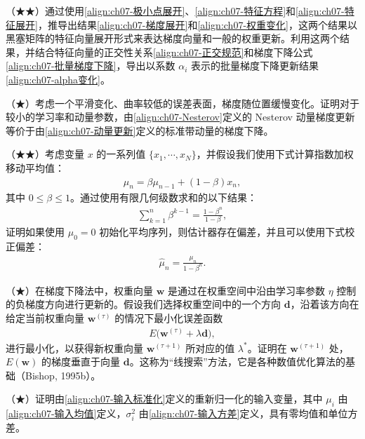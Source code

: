 \documentclass[../../main.tex]{subfiles}
\begin{document}
\begin{exercise}\label{exercise:ch07-10}
（★★）通过使用\eqref{align:ch07-极小点展开}、\eqref{align:ch07-特征方程}和\eqref{align:ch07-特征展开}，推导出结果\eqref{align:ch07-梯度展开}和\eqref{align:ch07-权重变化}，这两个结果以黑塞矩阵的特征向量展开形式来表达梯度向量和一般的权重更新。利用这两个结果，并结合特征向量的正交性关系\eqref{align:ch07-正交规范}和梯度下降公式\eqref{align:ch07-批量梯度下降}，导出以系数 $\alpha_i$ 表示的批量梯度下降更新结果\eqref{align:ch07-alpha变化}。
\end{exercise}

\begin{exercise}\label{exercise:ch07-11}
（★）考虑一个平滑变化、曲率较低的误差表面，梯度随位置缓慢变化。证明对于较小的学习率和动量参数，由\eqref{align:ch07-Nesterov}定义的 Nesterov 动量梯度更新等价于由\eqref{align:ch07-动量更新}定义的标准带动量的梯度下降。
\end{exercise}

\begin{exercise}\label{exercise:ch07-12}
（★★）考虑变量 $x$ 的一系列值 $\{x_1,\cdots,x_N\}$，并假设我们使用下式计算指数加权移动平均值：
\begin{align}
\mu_n = \beta\mu_{n-1}+(1-\beta)x_n,
\label{align:ch07-习题ewma}
\end{align}
其中 $0\leqslant\beta\leqslant1$。通过使用有限几何级数求和的以下结果：
\begin{align}
\sum_{k=1}^{n}\beta^{k-1} = \frac{1-\beta^{n}}{1-\beta},
\label{align:ch07-习题几何级数}
\end{align}
证明如果使用 $\mu_0=0$ 初始化平均序列，则估计器存在偏差，并且可以使用下式校正偏差：
\begin{align}
\hat{\mu}_n = \frac{\mu_n}{1-\beta^{n}}.
\label{align:ch07-习题偏差校正}
\end{align}
\end{exercise}

\begin{exercise}\label{exercise:ch07-13}
（★）在梯度下降法中，权重向量 $\mathbf{w}$ 是通过在权重空间中沿由学习率参数 $\eta$ 控制的负梯度方向进行更新的。假设我们选择权重空间中的一个方向 $\mathbf{d}$，沿着该方向在给定当前权重向量 $\mathbf{w}^{(\tau)}$ 的情况下最小化误差函数
\begin{align}
E\bigl(\mathbf{w}^{(\tau)}+\lambda\mathbf{d}\bigr),
\label{align:ch07-习题线搜索}
\end{align}
进行最小化，以获得新权重向量 $\mathbf{w}^{(\tau+1)}$ 所对应的值 $\lambda^{\ast}$。证明在 $\mathbf{w}^{(\tau+1)}$ 处，$E(\mathbf{w})$ 的梯度垂直于向量 $\mathbf{d}$。这称为“线搜索”方法，它是各种数值优化算法的基础（Bishop, 1995b）。
\end{exercise}

\begin{exercise}\label{exercise:ch07-14}
（★）证明由\eqref{align:ch07-输入标准化}定义的重新归一化的输入变量，其中 $\mu_i$ 由\eqref{align:ch07-输入均值}定义，$\sigma_i^{2}$ 由\eqref{align:ch07-输入方差}定义，具有零均值和单位方差。
\end{exercise}
\end{document}
